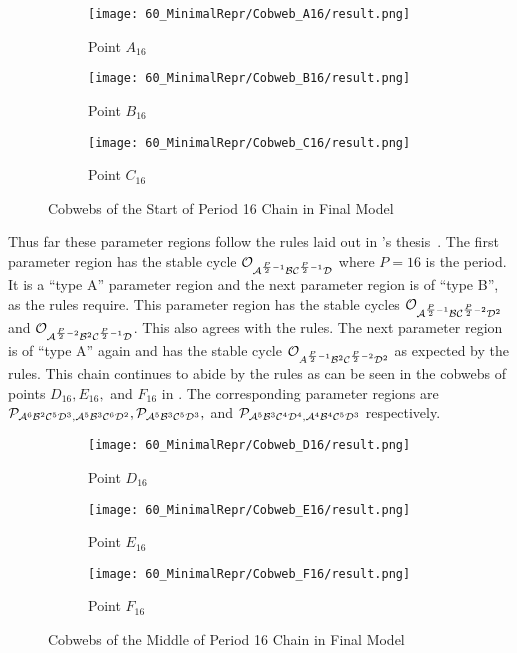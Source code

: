 \begin{figure}
	\centering
	\begin{subfigure}{0.3\textwidth}
		\centering
		\texttt{[image: 60\_MinimalRepr/Cobweb\_A16/result.png]}
		\caption{Point $A_{16}$}
		\label{fig:final.cob.A16}
	\end{subfigure}
	\begin{subfigure}{0.3\textwidth}
		\centering
		\texttt{[image: 60\_MinimalRepr/Cobweb\_B16/result.png]}
		\caption{Point $B_{16}$}
		\label{fig:final.cob.B16}
	\end{subfigure}
	\begin{subfigure}{0.3\textwidth}
		\centering
		\texttt{[image: 60\_MinimalRepr/Cobweb\_C16/result.png]}
		\caption{Point $C_{16}$}
		\label{fig:final.cob.C16}
	\end{subfigure}
	\caption{Cobwebs of the Start of Period 16 Chain in Final Model}
	\label{fig:final.cob.start16}
\end{figure}

Thus far these parameter regions follow the rules laid out in 's thesis~\Cite{akyuz2022}.
The first parameter region has the stable cycle $\mathcal{O}_{\mathcal{A}^{\frac{P}{2} - 1}\mathcal{B}\mathcal{C}^{\frac{P}{2} - 1}\mathcal{D}}$ where $P = 16$ is the period.
It is a ``type A'' parameter region and the next parameter region is of ``type B'', as the rules require.
This parameter region has the stable cycles $\mathcal{O}_{\mathcal{A}^{\frac{P}{2} - 1}\mathcal{B}\mathcal{C}^{\frac{P}{2} - 2}\mathcal{D}^2}$ and $\mathcal{O}_{\mathcal{A}^{\frac{P}{2} - 2}\mathcal{B}^2\mathcal{C}^{\frac{P}{2} - 1}\mathcal{D}}$.
This also agrees with the rules.
The next parameter region is of ``type A'' again and has the stable cycle $\mathcal{O}_{A^{\frac{P}{2} - 1}\mathcal{B}^2\mathcal{C}^{\frac{P}{2} - 2}\mathcal{D}^2}$ as expected by the rules.
This chain continues to abide by the rules as can be seen in the cobwebs of points $D_{16}, E_{16},$ and $F_{16}$ in .
The corresponding parameter regions are $\mathcal{P}_{\mathcal{A}^6\mathcal{B}^2\mathcal{C}^5\mathcal{D}^3, \mathcal{A}^5\mathcal{B}^3\mathcal{C}^6\mathcal{D}^2}, \mathcal{P}_{\mathcal{A}^5\mathcal{B}^3\mathcal{C}^5\mathcal{D}^3},$ and $\mathcal{P}_{\mathcal{A}^5\mathcal{B}^3\mathcal{C}^4\mathcal{D}^4, \mathcal{A}^4\mathcal{B}^4\mathcal{C}^5\mathcal{D}^3}$ respectively.

\begin{figure}
	\centering
	\begin{subfigure}{0.3\textwidth}
		\centering
		\texttt{[image: 60\_MinimalRepr/Cobweb\_D16/result.png]}
		\caption{Point $D_{16}$}
		\label{fig:final.cob.D16}
	\end{subfigure}
	\begin{subfigure}{0.3\textwidth}
		\centering
		\texttt{[image: 60\_MinimalRepr/Cobweb\_E16/result.png]}
		\caption{Point $E_{16}$}
		\label{fig:final.cob.E16}
	\end{subfigure}
	\begin{subfigure}{0.3\textwidth}
		\centering
		\texttt{[image: 60\_MinimalRepr/Cobweb\_F16/result.png]}
		\caption{Point $F_{16}$}
		\label{fig:final.cob.F16}
	\end{subfigure}
	\caption{Cobwebs of the Middle of Period 16 Chain in Final Model}
	\label{fig:final.cob.mid16}
\end{figure}
